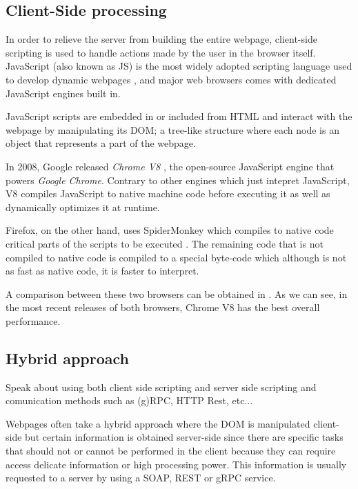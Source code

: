 \subsection{Client-Side processing}
In order to relieve the server from building the entire webpage, client-side scripting is used to handle actions made by the user in the browser itself. JavaScript (also known as JS) is the most widely adopted scripting language used to develop dynamic webpages \cite{js_stats}, and major web browsers comes with dedicated JavaScript engines built in.  

JavaScript scripts are embedded in or included from HTML and interact with the webpage by manipulating its DOM; a tree-like structure where each node is an object that represents a part of the webpage. 

In 2008, Google released \textit{Chrome V8} \cite{chrome_v8}, the open-source JavaScript engine that powers \textit{Google Chrome}. Contrary to other engines which just intepret JavaScript, V8 compiles JavaScript to native machine code before executing it as well as dynamically optimizes it at runtime.

Firefox, on the other hand, uses SpiderMonkey which compiles to native code critical parts of the scripts to be executed \cite{tampermoneky}. The remaining code that is not compiled to native code is compiled to a special byte-code which although is not as fast as native code, it is faster to interpret.

A comparison between these two browsers can be obtained in \cite{firefox_benchmark}. As we can see, in the most recent releases of both browsers, Chrome V8 has the best overall performance.

\subsection{Hybrid approach}
Speak about using both client side scripting and server side scripting and comunication methods such as (g)RPC, HTTP Rest, etc...

Webpages often take a hybrid approach where the DOM is manipulated client-side but certain information is obtained server-side since there are specific tasks that should not or cannot be performed in the client because they can require access delicate information or high processing power. This information is usually requested to a server by using a SOAP, REST or gRPC service.

